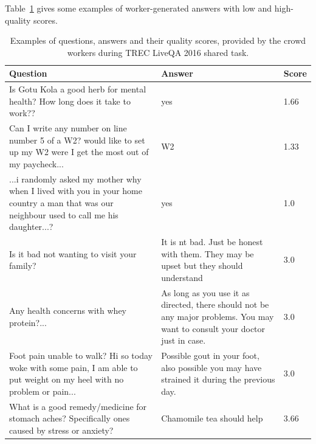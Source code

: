 Table~\ref{table:non-factoid:crowdsourcing:crqa:answer_examples} gives some examples of worker-generated answers with low and high-quality scores.

\begin{table}
\centering
\small
\begin{tabular}{p{6cm}|p{5cm}|l}
Question & Answer & Score \\
\hline
 Is Gotu Kola a good herb for mental health? How long does it take to work?? & yes & 1.66\\
 \hline
Can I write any number on line number 5 of a W2?  would like to set up my W2 were I get the most out of my paycheck... & W2 & 1.33\\
 \hline
...i randomly asked my mother why when I lived with you in your home country a man that was our neighbour used to call me his daughter...? & yes & 1.0\\
\hline
\hline
 Is it bad not wanting to visit your family? & It is nt bad. Just be honest with them. They may be upset but they should understand & 3.0 \\
 \hline
Any health concerns with whey protein?... & As long as you use it as directed, there should not be any major problems.  You may want to consult your doctor just in case. & 3.0\\
\hline
Foot pain unable to walk? Hi so today woke with some pain, I am able to put weight on my heel with no problem or pain... & Possible gout in your foot, also possible you may have strained it during the previous day. & 3.0\\
\hline
What is a good remedy/medicine for stomach aches? Specifically ones caused by stress or anxiety? & Chamomile tea should help & 3.66\\
\end{tabular}
\caption{Examples of questions, answers and their quality scores, provided by the crowd workers during TREC LiveQA 2016 shared task.}
\label{table:non-factoid:crowdsourcing:crqa:answer_examples}
\end{table}

